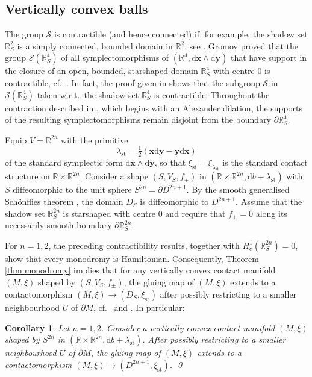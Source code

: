 \documentclass{amsart}
\newtheorem{cor}[prop]{Corollary}
\theoremstyle{definition}
\newcommand{\rmd}{\mathrm d}
\newcommand{\R}{\mathbb R}
\renewcommand{\SS}{\mathcal S}
\newcommand{\bfx}{\mathbf x}
\newcommand{\bfy}{\mathbf y}
\newcommand{\ra}{\rightarrow}
\DeclareMathOperator{\st}{\mathrm{st}}
\begin{document}

\subsection{Vertically convex balls\label{sec:vcballs}}

The group $\SS$ is contractible
(and hence connected) if, for example,
the shadow set $\R^2_S$ is a
simply connected, bounded domain in $\R^2$,
see \cite[Theorem~1.8]{agz22}.
Gromov \cite{grom85} proved that
the group $\SS(\R^4_S)$ of all symplectomorphisms
of $(\R^4,\rmd\bfx\wedge\rmd\bfy)$
that have support in the closure of
an open, bounded, starshaped domain $\R^4_S$
with centre $0$ is contractible,
cf.\ \cite[Theorem~9.5.2]{mcsa12}.
In fact,
the proof given in \cite[Theorem~9.5.2]{mcsa12} shows
that the subgroup $\SS$ in $\SS(\R^4_S)$
taken w.r.t.\ the shadow set $\R^4_S$
is contractible.
Throughout the contraction described in
\cite[Theorem~9.5.2]{mcsa12},
which begins with an Alexander dilation,
the supports of the resulting symplectomorphisms
remain disjoint from the boundary $\partial\R^4_S$.

Equip $V=\R^{2n}$ with the primitive
\[
\lambda_{\st}=\tfrac12(\bfx\rmd\bfy-\bfy\rmd\bfx)
\]
of the standard symplectic form 
$\rmd\bfx\wedge\rmd\bfy$,
so that $\xi_{\st}=\xi_{\lambda_{\st}}$
is the standard contact structure on $\R\times\R^{2n}$.
Consider a shape
$(S,V_S,f_{\pm})$ in $(\R\times\R^{2n},\rmd b+\lambda_{\st})$
with $S$ diffeomorphic
to the unit sphere $S^{2n}=\partial D^{2n+1}$.
By the smooth generalised Sch\"onflies theorem \cite{sm61},
the domain $D_S$ is diffeomorphic to $D^{2n+1}$.
Assume that the shadow set $\R^{2n}_S$ is starshaped
with centre $0$ and require that
$f_{\pm}=0$ along its necessarily smooth boundary
$\partial\R^{2n}_S$.

For $n=1,2$,
the preceding contractibility results,
together with
$H_c^1(\R^{2n}_S)=0$,
show that every monodromy is Hamiltonian.
Consequently,
Theorem \ref{thm:monodromy} implies that
for any vertically convex contact manifold $(M,\xi)$
shaped by $(S,V_S,f_{\pm})$,
the gluing map of $(M,\xi)$ extends to a contactomorphism
$(M,\xi)\ra(D_S,\xi_{\st})$
after possibly restricting to a smaller neighbourhood
$U$ of $\partial M$,
cf.\ \cite[p.\ 1305, Item~1.b)]{eh94} and \cite[Theorem~1]{efz}.
In particular:


\begin{cor}
\label{cor:roundball}
 Let $n=1,2$.
 Consider a vertically convex contact manifold $(M,\xi)$
 shaped by $S^{2n}$ in $(\R\times\R^{2n},\rmd b+\lambda_{\st})$. 
 After possibly restricting to a smaller neighbourhood
 $U$ of $\partial M$,
 the gluing map of $(M,\xi)$ extends to a contactomorphism
 $(M,\xi)\ra(D^{2n+1},\xi_{\st})$.
 \qed
\end{cor}
\end{document}

